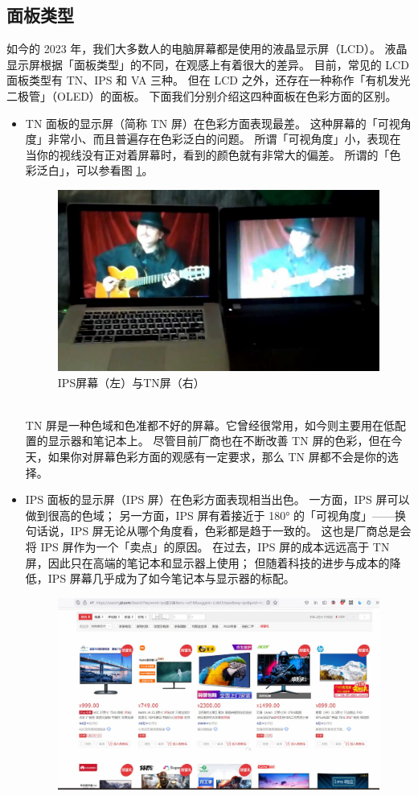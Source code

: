\subsection{面板类型}

如今的 2023 年，我们大多数人的电脑屏幕都是使用的液晶显示屏（LCD）。
液晶显示屏根据「面板类型」的不同，在观感上有着很大的差异。
目前，常见的 LCD 面板类型有 TN、IPS 和 VA 三种。
但在 LCD 之外，还存在一种称作「有机发光二极管」（OLED）的面板。
下面我们分别介绍这四种面板在色彩方面的区别。

\begin{itemize}
  \item TN 面板的显示屏（简称 TN 屏）在色彩方面表现最差。
    这种屏幕的「可视角度」非常小、而且普遍存在色彩泛白的问题。
    所谓「可视角度」小，表现在当你的视线没有正对着屏幕时，看到的颜色就有非常大的偏差。
    所谓的「色彩泛白」，可以参看图 \ref{IPS_vs_TN}。
    \begin{figure}[htb!]
      \centering
      \includegraphics[width=11cm]{assets/IPS_vs_TN.jpg}
      \caption{IPS屏幕（左）与TN屏（右）}
      \label{IPS_vs_TN}
    \end{figure}\\
    TN 屏是一种色域和色准都不好的屏幕。它曾经很常用，如今则主要用在低配置的显示器和笔记本上。
    尽管目前厂商也在不断改善 TN 屏的色彩，但在今天，如果你对屏幕色彩方面的观感有一定要求，那么 TN 屏都不会是你的选择。
  \item IPS 面板的显示屏（IPS 屏）在色彩方面表现相当出色。
    一方面，IPS 屏可以做到很高的色域；
    另一方面，IPS 屏有着接近于 180° 的「可视角度」——换句话说，IPS 屏无论从哪个角度看，色彩都是趋于一致的。
    这也是厂商总是会将 IPS 屏作为一个「卖点」的原因。
    在过去，IPS 屏的成本远远高于 TN 屏，因此只在高端的笔记本和显示器上使用；
    但随着科技的进步与成本的降低，IPS 屏幕几乎成为了如今笔记本与显示器的标配。
    \begin{figure}[htb!]
      \centering
      \includegraphics[width=13cm]{assets/IPS_at_Low_Price.jpg}

\end{figure}
\end{itemize}
